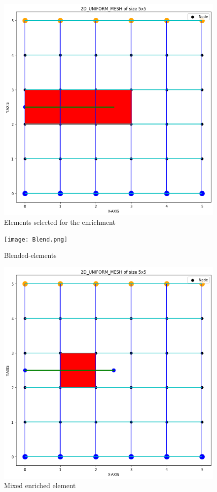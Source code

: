 \documentclass[fleqn, 12.5pt,a4paper]{report}
\begin{document}
\begin{figure}[H]
  \centering
  \includegraphics[scale=0.4]{enriched.png}
  \caption{Elements selected for the enrichment}
  \label{fig:1}
\end{figure}

\begin{figure}[h]
  \centering
  \texttt{[image: Blend.png]}
  \caption{Blended-elements}
  \label{fig:2}
\end{figure}

\begin{figure}[H]
  \centering
  \includegraphics[scale=0.4]{pretip.png}
  \caption{Mixed enriched element}
  \label{fig:3}  
\end{figure}
\end{document}
